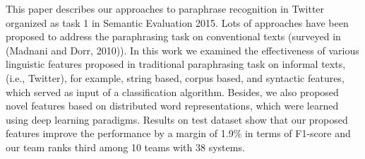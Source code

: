 This paper describes our approaches to paraphrase recognition in Twitter organized as task 1 in Semantic Evaluation 2015. Lots of approaches have been proposed to address the paraphrasing task on conventional texts (surveyed in (Madnani and Dorr, 2010)). In this work we examined the effectiveness of various linguistic features proposed in traditional paraphrasing task on informal texts, (i.e., Twitter), for example, string based, corpus based, and syntactic features, which served as input of a classification algorithm. Besides, we also proposed novel features based on distributed word representations, which were learned using deep learning paradigms. Results on test dataset show that our proposed features improve the performance by a margin of 1.9\% in terms of F1-score and our team ranks third among 10 teams with 38 systems.
